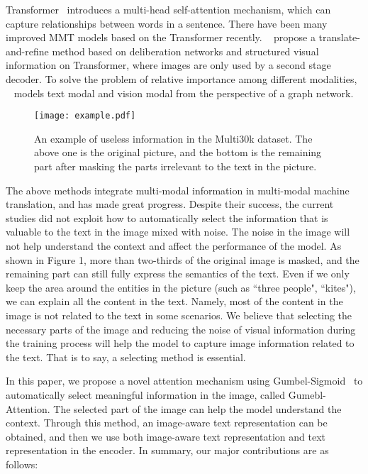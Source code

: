 \documentclass{article}
\begin{document}
Transformer~\cite{DBLP:conf/nips/VaswaniSPUJGKP17} introduces a multi-head self-attention mechanism, which can capture relationships between words in a sentence.
There have been many improved MMT models based on the Transformer recently.
~\cite{DBLP:conf/acl/IveMS19} propose a translate-and-refine method based on deliberation networks and structured visual information on Transformer, where images are only used by a second stage decoder. 
To solve the problem of relative importance among different modalities,  ~\cite{DBLP:conf/acl/YaoW20} models text modal and vision modal from the perspective of a graph network.
\begin{figure}[t]
\centering\texttt{[image: example.pdf]}
	\footnotesize\caption{An example of useless information in the Multi30k dataset. The above one is the original picture, and the bottom is the remaining part after masking the parts irrelevant to the text in the picture.} 
	\label{fig:01}
\end{figure}

The above methods integrate multi-modal information in multi-modal machine translation, and has made great progress. 
Despite their success, the current studies did not exploit how to automatically select the information that is valuable to the text in the image mixed with noise.
The noise in the image will not help understand the context and affect the performance of the model.
As shown in Figure 1, more than two-thirds of the original image is masked, and the remaining part can still fully express the semantics of the text. Even if we only keep the area around the entities in the picture (such as ``three people", ``kites"), we can explain all the content in the text. 
Namely, most of the content in the image is not related to the text in some scenarios.                                          
We believe that selecting the necessary parts of the image and reducing the noise of visual information during the training process will help the model to capture image information related to the text. That is to say, a selecting method is essential.

In this paper, we propose a novel attention mechanism using  Gumbel-Sigmoid~\cite{DBLP:conf/acl/GengWWQLT20} to automatically select meaningful information in the image, called Gumebl-Attention. The selected part of the image can help the model understand the context.
Through this method, an image-aware text representation can be obtained, and then we use both image-aware text representation and text representation in the encoder.
In summary, our major contributions are as follows:
\end{document}
